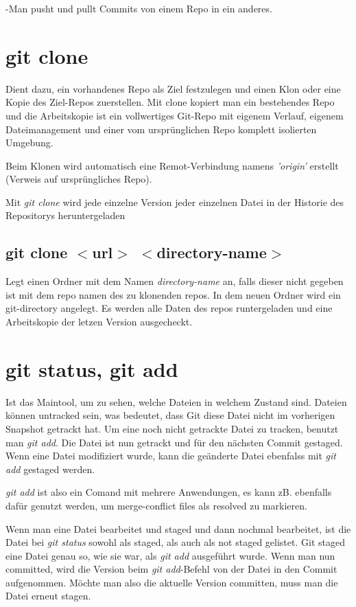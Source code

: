 \documentclass{article}
\begin{document}
-Man pusht und pullt Commits von einem Repo in ein anderes.\\

\section*{git clone}
Dient dazu, ein vorhandenes Repo als Ziel festzulegen und einen Klon oder eine Kopie des Ziel-Repos zuerstellen.
Mit clone kopiert man ein bestehendes Repo und die Arbeitskopie ist ein vollwertiges Git-Repo mit eigenem Verlauf, eigenem Dateimanagement und einer vom ursprünglichen Repo komplett isolierten Umgebung.

Beim Klonen wird automatisch eine Remot-Verbindung namens \textit{'origin'} erstellt (Verweis auf ursprüngliches Repo).

Mit \textit{git clone} wird jede einzelne Version jeder einzelnen Datei in der Historie des Repositorys heruntergeladen

\subsection*{git clone $<$url$>$ $<$directory-name$>$}
Legt einen Ordner mit dem Namen \textit{directory-name} an, falls dieser nicht gegeben ist mit dem repo namen des zu klonenden repos. In dem neuen Ordner wird ein git-directory angelegt. Es werden alle Daten des repos runtergeladen und eine Arbeitskopie der letzen Version ausgecheckt.

\section*{git status, git add}
Ist das Maintool, um zu sehen, welche Dateien in welchem Zustand sind.
Dateien können untracked sein, was bedeutet, dass Git diese Datei nicht im vorherigen Snapshot getrackt hat. Um eine noch nicht getrackte Datei zu tracken, benutzt man \textit{git add}. Die Datei ist nun getrackt und für den nächsten Commit gestaged. Wenn eine Datei modifiziert wurde, kann die geänderte Datei ebenfalss mit \textit{git add} gestaged werden. 

\textit{git add} ist also ein Comand mit mehrere Anwendungen, es kann zB. ebenfalls dafür genutzt werden, um merge-conflict files als resolved zu markieren.

Wenn man eine Datei bearbeitet und staged und dann nochmal bearbeitet, ist die Datei bei \textit{git status} sowohl als staged, als auch als not staged gelistet. Git staged eine Datei genau so, wie sie war, als \textit{git add} ausgeführt wurde. Wenn man nun committed, wird die Version beim \textit{git add}-Befehl von der Datei in den Commit aufgenommen. Möchte man also die aktuelle Version committen, muss man die Datei erneut stagen.
\end{document}
